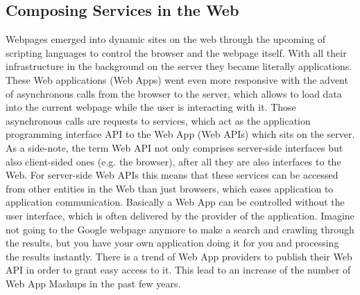 \subsection{Composing Services in the Web}
Webpages emerged into dynamic sites on the web through the upcoming of scripting languages to control the browser and the webpage itself.
With all their infrastructure in the background on the server they became literally applications.
These Web applications (\textrm{Web Apps}) went even more responsive with the advent of asynchronous calls from the browser to the server, which allows to load data into the current webpage while the user is interacting with it.
Those asynchronous calls are requests to services, which act as the application programming interface \textrm{API} to the \textrm{Web App} (\textrm{Web APIs}) which sits on the server.
As a side-note, the term \textrm{Web API} not only comprises server-side interfaces but also client-sided ones (e.g. the browser), after all they are also interfaces to the Web.
For server-side \textrm{Web APIs} this means that these services can be accessed from other entities in the Web than just browsers, which eases application to application communication.
Basically a \textrm{Web App} can be controlled without the user interface, which is often delivered by the provider of the application.
Imagine not going to the Google webpage anymore to make a search and crawling through the results, but you have your own application doing it for you and processing the results instantly.
There is a trend of \textrm{Web App} providers to publish their \textrm{Web API} in order to grant easy access to it.
This lead to an increase of the number of \textrm{Web App Mashups} in the past few years.


